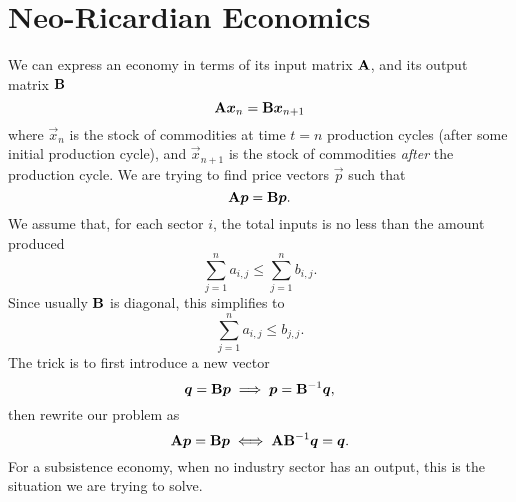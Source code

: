 \section{Neo-Ricardian Economics}

We can express an economy in terms of its input matrix $\mathbf{A}$, and
its output matrix $\mathbf{B}$
\begin{equation}
\mathbf{A}\boldsymbol{x}_{n} = \mathbf{B}\boldsymbol{x}_{n+1}
\end{equation}
where $\vec{x}_{n}$ is the stock of commodities at time $t=n$ production
cycles (after some initial production cycle), and $\vec{x}_{n+1}$ is the
stock of commodities \emph{after} the production cycle. We are trying to
find price vectors $\vec{p}$ such that
\begin{equation}
\mathbf{A}\boldsymbol{p} = \mathbf{B}\boldsymbol{p}.
\end{equation}
We assume that, for each sector $i$, the total inputs is no less than
the amount produced
\begin{equation}
\sum_{j=1}^{n}a_{i,j} \leq\sum_{j=1}^{n}b_{i,j}.
\end{equation}
Since usually $\mathbf{B}$ is diagonal, this simplifies to
\begin{equation*}
\sum_{j=1}^{n}a_{i,j} \leq b_{j,j}.
\end{equation*}
The trick is to first introduce a new vector
\begin{equation}
\boldsymbol{q} = \mathbf{B}\boldsymbol{p}\implies \boldsymbol{p}=\mathbf{B}^{-1}\boldsymbol{q},
\end{equation}
then rewrite our problem as
\begin{equation}
\mathbf{A}\boldsymbol{p} = \mathbf{B}\boldsymbol{p}\iff \mathbf{A}\mathbf{B}^{-1}\boldsymbol{q} = \boldsymbol{q}.
\end{equation}
For a subsistence economy, when no industry sector has an output, this
is the situation we are trying to solve.

